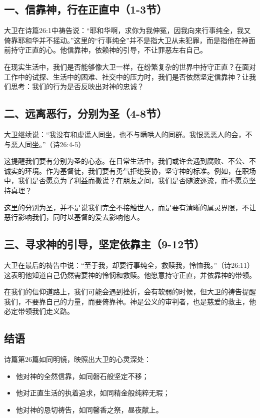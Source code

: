 \documentclass[a4paper, 12pt]{article}
\begin{document}
\subsection*{一、信靠神，行在正直中（1-3节）}

\hspace{0.6cm}大卫在诗篇26:1中祷告说：“耶和华啊，求你为我伸冤，因我向来行事纯全，我又倚靠耶和华并不摇动。”这里的“行事纯全”并不是指大卫从未犯罪，而是指他在神面前持守正直的心。他信靠神，依赖神的引导，不让罪恶左右自己。

在现实生活中，我们是否能够像大卫一样，在纷繁复杂的世界中持守正直？在面对工作中的试探、生活中的困难、社交中的压力时，我们是否依然坚定信靠神？让我们思考：我们的行为是否反映出对神的忠诚？

\subsection*{二、远离恶行，分别为圣（4-8节）}

\hspace{0.6cm}大卫继续说：“我没有和虚谎人同坐，也不与瞒哄人的同群。我恨恶恶人的会，不与恶人同坐。”（诗26:4-5）

这提醒我们要有分别为圣的心态。在日常生活中，我们或许会遇到腐败、不公、不诚实的环境。作为基督徒，我们要有勇气拒绝妥协，坚守神的标准。例如，在职场中，我们是否愿意为了利益而撒谎？在朋友之间，我们是否随波逐流，而不愿意坚持真理？

这里的分别为圣，并不是说我们完全不接触世人，而是要有清晰的属灵界限，不让恶行影响我们，同时以基督的爱去影响他人。

\subsection*{三、寻求神的引导，坚定依靠主（9-12节）}

\hspace{0.6cm}大卫在最后的祷告中说：“至于我，却要行事纯全，救赎我，怜恤我。”（诗26:11）这表明他知道自己仍然需要神的怜悯和救赎。他愿意持守正直，并依靠神的带领。

在我们的信仰道路上，我们可能会遇到挫折，会有软弱的时候，但大卫的祷告提醒我们，不要靠自己的力量，而要倚靠神。神是公义的审判者，也是慈爱的救主，他必定带领我们走义路。

\subsection*{结语}

诗篇第26篇如同明镜，映照出大卫的心灵深处：
\begin{itemize}
    \item 他对神的全然信靠，如同磐石般坚定不移；
    \item 他对正直生活的执着追求，如同精金般纯粹无瑕；
    \item 他对神的恳切祷告，如同馨香之祭，昼夜献上。
\end{itemize}
\end{document}
